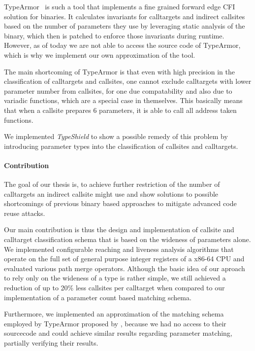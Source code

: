 TypeArmor~\cite{veen:typearmor} is such a tool that implements a fine grained forward edge CFI solution for binaries. It calculates invariants for calltargets and indirect callsites based on the number of parameters they use by leveraging static analysis of the binary, which then is patched to enforce those invariants during runtime. However, as of today we are not able to access the source code of TypeArmor, which is why we implement our own approximation of the tool.

The main shortcoming of TypeArmor is that even with high precision in the classification of calltargets and callsites, one cannot exclude calltargets with lower parameter number from callsites, for one due compatability and also due to variadic functions, which are a special case in themselves. This basically means that when a callsite prepares 6 parameters, it is able to call all address taken functions.


We implemented \textit{TypeShield} to show a possible remedy of this problem by introducing parameter types into the classification of callsites and calltargets. 

\paragraph{Contribution}
The goal of our thesis is, to achieve further restriction of the number of calltargets an indirect callsite might use and show solutions to possible shortcomings of previous binary based approaches to mitigate advanced code reuse attacks.


Our main contribution is thus the design and implementation of callsite and calltarget classification schema that is based on the wideness of parameters alone. We implemented configurable reaching and liveness analysis algorithms that operate on the full set of general purpose integer registers of a x86-64 CPU and evaluated various path merge operators. Although the basic idea of our aproach to rely only on the wideness of a type is rather simple, we still achieved a reduction of up to 20\% less callsites per calltarget when compared to our implementation of a parameter count based matching schema.


Furthermore, we implemented an approximation of the matching schema employed by TypeArmor proposed by \cite{veen:typearmor}, because we had no access to their sourcecode and could achieve similar results regarding parameter matching, partially verifying their results.

